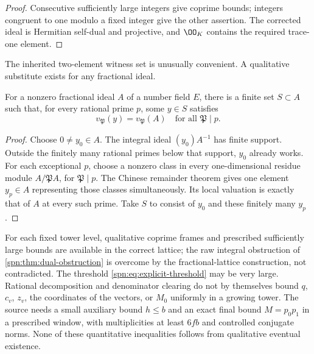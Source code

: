 \begin{proof}
Consecutive sufficiently large integers give coprime bounds; integers
congruent to one modulo a fixed integer give the other assertion. The
corrected ideal is Hermitian self-dual and projective, and $\OO_K$ contains
the required trace-one element.
\end{proof}

The inherited two-element witness set is unusually convenient. A qualitative
substitute exists for any fractional ideal.

\begin{lemma}\label{spn:lem:local-generators}
For a nonzero fractional ideal $A$ of a number field $E$, there is a finite
set $S\subset A$ such that, for every rational prime $p$, some $y\in S$
satisfies
\[
 v_{\mathfrak P}(y)=v_{\mathfrak P}(A)\quad\text{for all }\mathfrak P\mid p .
\]
\end{lemma}

\begin{proof}
Choose $0\ne y_0\in A$. The integral ideal $(y_0)A^{-1}$ has finite support.
Outside the finitely many rational primes below that support, $y_0$ already
works. For each exceptional $p$, choose a nonzero class in every
one-dimensional residue module $A/\mathfrak PA$, for $\mathfrak P\mid p$. The
Chinese remainder theorem gives one element $y_p\in A$ representing those
classes simultaneously. Its local valuation is exactly that of $A$ at every
such prime. Take $S$ to consist of $y_0$ and these finitely many $y_p$.
\end{proof}

\begin{remark}\label{spn:rem:projective-limits}
For each fixed tower level, qualitative coprime frames and prescribed
sufficiently large bounds are available in the correct lattice; the raw
integral obstruction of \cref{spn:thm:dual-obstruction} is overcome by the
fractional-lattice construction, not contradicted. The threshold
\eqref{spn:eq:explicit-threshold} may be very large. Rational decomposition
and denominator clearing do not by themselves bound $q$, $c_v$, $z_v$, the
coordinates of the vectors, or $M_0$ uniformly in a growing tower. The source
needs a small auxiliary bound $h\le b$ and an exact final bound $M=p_0p_1$ in
a prescribed window, with multiplicities at least $6fb$ and controlled
conjugate norms. None of these quantitative inequalities follows from
qualitative eventual existence.
\end{remark}

